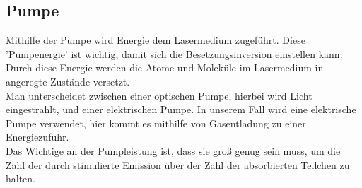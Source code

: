 \subsection{Pumpe}
Mithilfe der Pumpe wird Energie dem Lasermedium zugeführt.
Diese 'Pumpenergie' ist wichtig, damit sich die Besetzungsinversion einstellen kann. 
Durch diese Energie werden die Atome und Moleküle im Lasermedium in angeregte Zustände versetzt. \\
Man unterscheidet zwischen einer optischen Pumpe, hierbei wird Licht eingestrahlt, und einer elektrischen Pumpe. 
In unserem Fall wird eine elektrische Pumpe verwendet, hier kommt es mithilfe 
von Gasentladung zu einer Energiezufuhr.\\
Das Wichtige an der Pumpleistung ist, dass sie groß genug sein muss, um die Zahl der durch stimulierte Emission über der Zahl der absorbierten Teilchen zu halten. \citep[vgl.][]{laser1, laser2}


